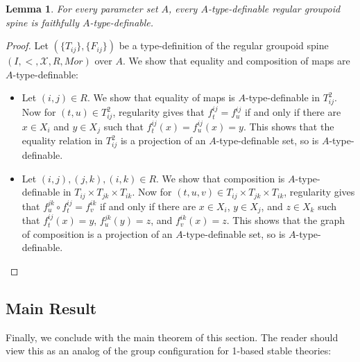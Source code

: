 \documentclass{amsart}
\newtheorem{lemma}[theorem]{Lemma}
\theoremstyle{definition}
\begin{document}
\begin{lemma}\label{L: regular weak is strong}
    For every parameter set $A$, every $A$-type-definable regular groupoid spine is faithfully $A$-type-definable.
\end{lemma}
\begin{proof} Let $(\{T_{ij}\},\{F_{ij}\})$ be a type-definition of the regular groupoid spine $(I,<,\mathcal X,R,Mor)$ over $A$. We show that equality and composition of maps are $A$-type-definable:
    \begin{itemize}
        \item Let $(i,j)\in R$. We show that equality of maps is $A$-type-definable in $T_{ij}^2$. Now for $(t,u)\in T_{ij}^2$, regularity gives that $f_t^{ij}=f_u^{ij}$ if and only if there are $x\in X_i$ and $y\in X_j$ such that $f_t^{ij}(x)=f_u^{ij}(x)=y$. This shows that the equality relation in $T_{ij}^2$ is a projection of an $A$-type-definable set, so is $A$-type-definable.
        \item Let $(i,j),(j,k),(i,k)\in R$. We show that composition is $A$-type-definable in $T_{ij}\times T_{jk}\times T_{ik}$. Now for $(t,u,v)\in T_{ij}\times T_{jk}\times T_{ik}$, regularity gives that $f_u^{jk}\circ f_t^{ij}=f_v^{ik}$ if and only if there are $x\in X_i$, $y\in X_j$, and $z\in X_k$ such that $f_t^{ij}(x)=y$, $f_u^{jk}(y)=z$, and $f_v^{ik}(x)=z$. This shows that the graph of composition is a projection of an $A$-type-definable set, so is $A$-type-definable. 
    \end{itemize}
\end{proof}

\subsection{Main Result}
Finally, we conclude with the main theorem of this section. The reader should view this as an analog of the group configuration for 1-based stable theories:
\end{document}
